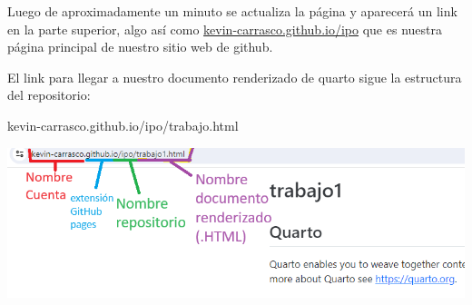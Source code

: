 \documentclass[
  letterpaper,
  DIV=11,
  numbers=noendperiod]{scrartcl}
\begin{document}
Luego de aproximadamente un minuto se actualiza la página y aparecerá un
link en la parte superior, algo así como
\url{kevin-carrasco.github.io/ipo} que es nuestra página principal de
nuestro sitio web de github.

El link para llegar a nuestro documento renderizado de quarto sigue la
estructura del repositorio:

kevin-carrasco.github.io/ipo/trabajo.html

\includegraphics{images/url-pages.png}
\end{document}
